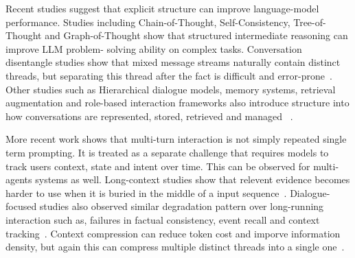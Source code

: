 Recent studies suggest that explicit structure can improve language-model performance. Studies including  Chain-of-Thought, Self-Consistency, Tree-of-
Thought and Graph-of-Thought show that structured intermediate reasoning can improve LLM problem- solving ability on complex tasks. Conversation disentangle studies show that mixed message streams naturally contain distinct threads, but separating this thread after the fact is difficult and error-prone~\cite{elsner2008talking,jiang2018disentangle,kummerfeld2019disentanglement}. Other studies such as Hierarchical dialogue models, memory systems, retrieval augmentation and role-based interaction frameworks also introduce structure into how conversations are represented, stored, retrieved and managed ~\cite{serban2016hred,packer2023memgpt,wu2024stateful,lewis2020rag,li2023camel}.

















More recent work shows that multi-turn interaction is not simply repeated single term prompting. It is treated as a separate challenge that requires models to track users context, state and intent over time. This can be observed for multi-agents systems as well. Long-context studies show that relevent evidence becomes harder to use when it is buried in the middle of a input sequence~\cite{liu2023lostinthemiddle}. Dialogue-focused studies also observed similar degradation pattern over long-running interaction such as, failures in factual consistency, event recall and context tracking~\cite{laban2024limt,maharana2024locomo,xu2022goldfish,xu2022longpersona}. Context compression can reduce token cost and imporve information density, but again this can compress multiple distinct threads into a single one~\cite{jiang2024longllmlingua}.










